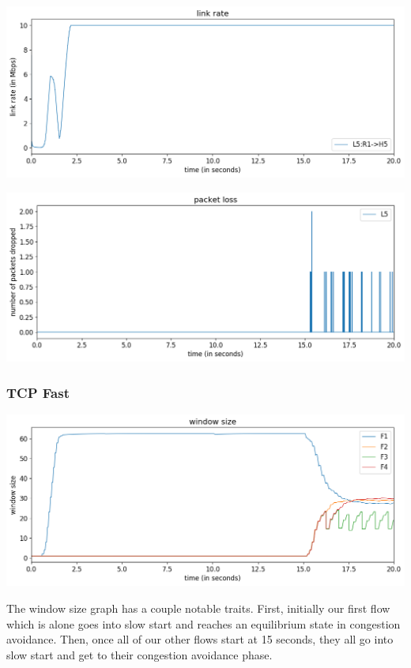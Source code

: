 \documentclass{article}
\begin{document}
\includegraphics[width = \textwidth]{"test_case5_reno link rate"}

\includegraphics[width = \textwidth]{"test_case5_reno packet loss"}




\subsubsection{TCP Fast}

\includegraphics[width = \textwidth]{"test_case5_fast window size"}

The window size graph has a couple notable traits. First, initially our first flow which is alone goes into slow start and reaches an equilibrium state in congestion avoidance. Then, once all of our other flows start at 15 seconds, they all go into slow start and get to their congestion avoidance phase. 
\end{document}
